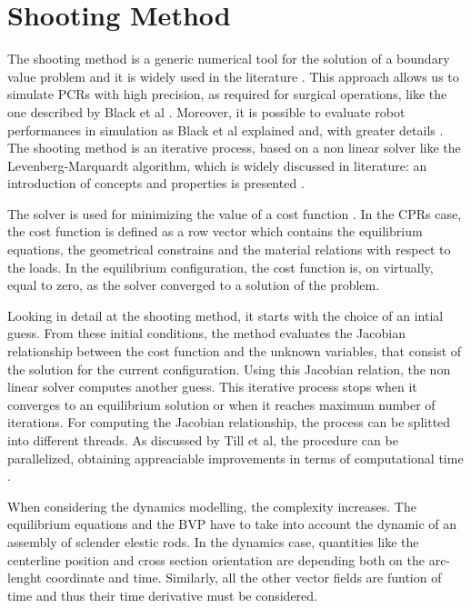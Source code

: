 \documentclass{thesisreport}
\begin{document}
 \section{Shooting Method}
 The shooting method is a generic numerical tool for the solution of a boundary value problem and it is widely used in the literature \cite{black_modeling_2017}\cite{black_parallel_2018}\cite{florian_geometrically_2020}. This approach allows us to simulate PCRs with high precision, as required for surgical operations, like the one described by Black et al \cite{black_modeling_2017}. Moreover, it is possible to evaluate robot performances in simulation as Black et al explained \cite{black_parallel_2018} and, with greater details \cite{black_modeling_2017}. The shooting method is an iterative process, based on a non linear solver like the Levenberg-Marquardt algorithm, which is widely discussed in literature: an introduction of concepts and properties is presented \cite{lourakis_brief_nodate}.
  
 The solver is used for minimizing the value of a cost function \cite{florian_geometrically_2020}. In the CPRs case, the cost function is defined as a row vector which contains the equilibrium equations, the geometrical constrains and the material relations with respect to the loads. In the equilibrium configuration, the cost function is, on virtually, equal to zero, as the solver converged to a solution of the problem.
 
 Looking in detail at the shooting method, it starts with the choice of an intial guess. From these initial conditions, the method evaluates the Jacobian relationship between the cost function and the unknown variables, that consist of the solution for the current configuration. Using this Jacobian relation, the non linear solver computes another guess. This iterative process stops when it converges to an equilibrium solution or when it reaches maximum number of iterations. For computing the Jacobian relationship, the process can be splitted into different threads. As discussed by Till et al, the procedure can be parallelized, obtaining appreaciable improvements in terms of computational time \cite{till_efficient_2015}.  
 
 When considering the dynamics modelling, the complexity increases. The equilibrium equations and the BVP have to take into account the dynamic of an assembly of sclender elestic rods. In the dynamics case, quantities like the centerline position and cross section orientation are depending both on the arc-lenght coordinate and time. Similarly, all the other vector fields are funtion of time and thus their time derivative must be considered. 
 
\end{document}
